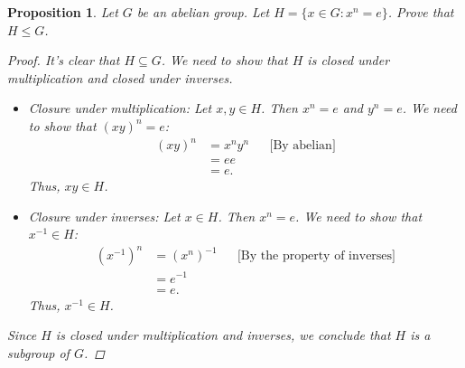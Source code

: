 \documentclass[12pt]{article}
\newtheorem{proposition}{Proposition}
\begin{document}
\begin{proposition}
  Let $G$ be an abelian group. Let $H = \{x \in G : x^n = e\}$. Prove that $H \leqslant G$.
  \begin{proof}
    It's clear that $H \subseteq G$. We need to show that $H$ is closed under multiplication and closed under inverses.
    \begin{itemize}
      \item Closure under multiplication: Let $x, y \in H$. Then $x^n = e$ and $y^n = e$.
            We need to show that $(xy)^n = e$:
            \begin{align*}
              (xy)^n & = x^n y^n &  & \text{[By abelian]} \\
                     & = ee                               \\
                     & = e.
            \end{align*}
            Thus, $xy \in H$.
      \item Closure under inverses: Let $x \in H$. Then $x^n = e$.
            We need to show that $x^{-1} \in H$:
            \begin{align*}
              (x^{-1})^n & = (x^n)^{-1} &  & \text{[By the property of inverses]} \\
                         & = e^{-1}                                               \\
                         & = e.
            \end{align*}
            Thus, $x^{-1} \in H$.
    \end{itemize}
    Since $H$ is closed under multiplication and inverses, we conclude that $H$ is a subgroup of $G$.
  \end{proof}
\end{proposition}
\end{document}
